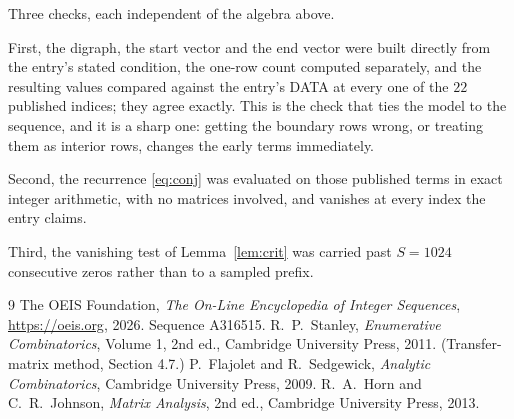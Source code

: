 \documentclass[11pt,a4paper]{article}
\theoremstyle{plain}
\theoremstyle{definition}
\begin{document}
Three checks, each independent of the algebra above.

First, the digraph, the start vector and the end vector were built directly from the
entry's stated condition, the one-row count computed separately, and the resulting values
compared against the entry's DATA at every one of the $22$ published indices; they
agree exactly. This is the check that ties the model to the sequence, and it is a sharp one:
getting the boundary rows wrong, or treating them as interior rows, changes the early terms
immediately.

Second, the recurrence \eqref{eq:conj} was evaluated on those published terms in exact
integer arithmetic, with no matrices involved, and vanishes at every index the entry claims.

Third, the vanishing test of Lemma~\ref{lem:crit} was carried past $S=1024$ consecutive
zeros rather than to a sampled prefix.

\begin{thebibliography}{9}
 The OEIS Foundation, \emph{The On-Line Encyclopedia of Integer
Sequences}, \url{https://oeis.org}, 2026. Sequence A316515.
 R.~P.~Stanley, \emph{Enumerative Combinatorics}, Volume 1, 2nd ed.,
Cambridge University Press, 2011. (Transfer-matrix method, Section 4.7.)
 P.~Flajolet and R.~Sedgewick, \emph{Analytic Combinatorics}, Cambridge
University Press, 2009.
 R.~A.~Horn and C.~R.~Johnson, \emph{Matrix Analysis}, 2nd ed., Cambridge
University Press, 2013.
\end{thebibliography}
\end{document}
